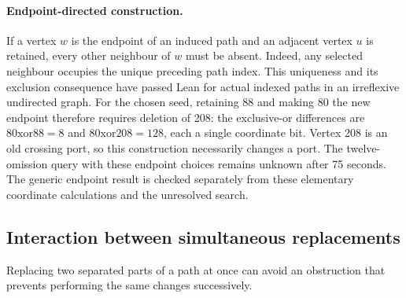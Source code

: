 \documentclass[11pt,a4paper]{article}
\theoremstyle{definition}
\theoremstyle{remark}
\begin{document}
\paragraph{Endpoint-directed construction.}
If a vertex $w$ is the endpoint of an induced path and an adjacent
vertex $u$ is retained, every other neighbour of $w$ must be absent.
Indeed, any selected neighbour occupies the unique preceding path
index. This uniqueness and its exclusion consequence have passed Lean
for actual indexed paths in an irreflexive undirected graph.
For the chosen seed, retaining 88 and making 80 the new endpoint
therefore requires deletion of 208: the exclusive-or differences are
$80\mathbin{\mathrm{xor}}88=8$ and
$80\mathbin{\mathrm{xor}}208=128$, each a single coordinate bit.
Vertex 208 is an old crossing port, so this construction necessarily
changes a port. The twelve-omission query with these endpoint choices
remains unknown after 75 seconds. The generic endpoint result is
checked separately from these elementary coordinate calculations and
the unresolved search.

\subsection{Interaction between simultaneous replacements}
\label{sec:twoblock224}
Replacing two separated parts of a path at once can avoid an obstruction
that prevents performing the same changes successively.
\end{document}

